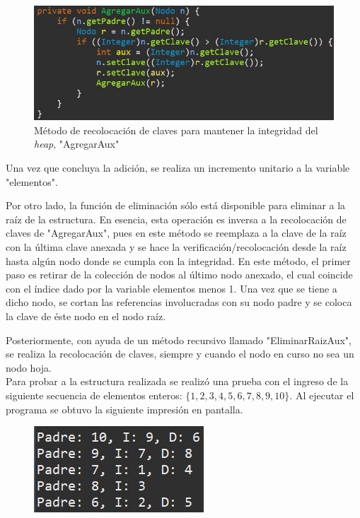 \documentclass[letterpaper, 11pt]{article}
\begin{document}
	\begin{figure}[H]
		\centering
		\includegraphics[scale=0.5]{"Imagenes/Método de recolocación"}
		\caption{Método de recolocación de claves para mantener la integridad del \textit{heap}, "AgregarAux"}
	\end{figure}
	
	Una vez que concluya la adición, se realiza un incremento unitario a la variable "elementos".
	
	Por otro lado, la función de eliminación sólo está disponible para eliminar a la raíz de la estructura. En esencia, esta operación es inversa a la recolocación de claves de "AgregarAux", pues en este método se reemplaza a la clave de la raíz con la última clave anexada y se hace la verificación/recolocación desde la raíz hasta algún nodo donde se cumpla con la integridad. En este método, el primer paso es retirar de la colección de nodos al último nodo anexado, el cual coincide con el índice dado por la variable elementos menos 1. Una vez que se tiene a dicho nodo, se cortan las referencias involucradas con su nodo padre y se coloca la clave de éste nodo en el nodo raíz. 

	Posteriormente, con ayuda de un método recursivo llamado "EliminarRaizAux", se realiza la recolocación de claves, siempre y cuando el nodo en curso no sea un nodo hoja. \\
	
	Para probar a la estructura realizada se realizó una prueba con el ingreso de la siguiente secuencia de elementos enteros: $\{1,2,3,4,5,6,7,8,9,10\}$. Al ejecutar el programa se obtuvo la siguiente impresión en pantalla.
	
	\begin{figure}[H]
		\centering
		\includegraphics[scale=0.5]{"Imagenes/Heap 1"}
	\end{figure}
	
\end{document}
